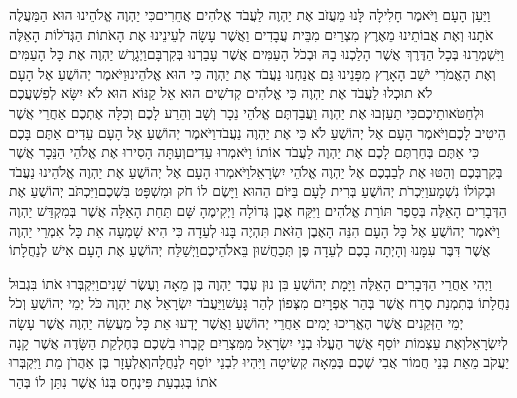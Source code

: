 \documentclass[../main/main.tex]{subfiles}
\begin{document}
\begin{multicols*}{\ncols}
וַיַּעַן הָעָם וַיֹּאמֶר חָלִילָה לָּנוּ מֵעֲזֹב אֶת יַהְוֶה לַעֲבֹד אֱלֹהִים אֲחֵרִים\PreVerseSpace{}כִּי יַהְוֶה אֱלֹהֵינוּ הוּא הַמַּעֲלֶה אֹתָנוּ וְאֶת אֲבוֹתֵינוּ מֵאֶרֶץ מִצְרַיִם מִבֵּית עֲבָדִים וַאֲשֶׁר עָשָׂה לְעֵינֵינוּ אֶת הָאֹתוֹת הַגְּדֹלוֹת הָאֵלֶּה וַיִּשְׁמְרֵנוּ בְּכָל הַדֶּרֶךְ אֲשֶׁר הָלַכְנוּ בָהּ וּבְכֹל הָעַמִּים אֲשֶׁר עָבַרְנוּ בְּקִרְבָּם\PreVerseSpace{}וַיְגָרֶשׁ יַהְוֶה אֶת כָּל הָעַמִּים וְאֶת הָאֱמֹרִי יֹשֵׁב הָאָרֶץ מִפָּנֵינוּ גַּם אֲנַחְנוּ נַעֲבֹד אֶת יַהְוֶה כִּי הוּא אֱלֹהֵינוּ\PreVerseSpace{}וַיֹּאמֶר יְהוֹשֻׁעַ אֶל הָעָם לֹא תוּכְלוּ לַעֲבֹד אֶת יַהְוֶה כִּי אֱלֹהִים קְדֹשִׁים הוּא אֵל קַנּוֹא הוּא לֹא יִשָּׂא לְפִשְׁעֲכֶם וּלְחַטֹּאותֵיכֶם\PreVerseSpace{}כִּי תַעַזְבוּ אֶת יַהְוֶה וַעֲבַדְתֶּם אֱלֹהֵי נֵכָר וְשָׁב וְהֵרַע לָכֶם וְכִלָּה אֶתְכֶם אַחֲרֵי אֲשֶׁר הֵיטִיב לָכֶם\PreVerseSpace{}וַיֹּאמֶר הָעָם אֶל יְהוֹשֻׁעַ לֹא כִּי אֶת יַהְוֶה נַעֲבֹד\PreVerseSpace{}וַיֹּאמֶר יְהוֹשֻׁעַ אֶל הָעָם עֵדִים אַתֶּם בָּכֶם כִּי אַתֶּם בְּחַרְתֶּם לָכֶם אֶת יַהְוֶה לַעֲבֹד אוֹתוֹ וַיֹּאמְרוּ עֵדִים\PreVerseSpace{}וְעַתָּה הָסִירוּ אֶת אֱלֹהֵי הַנֵּכָר אֲשֶׁר בְּקִרְבְּכֶם וְהַטּוּ אֶת לְבַבְכֶם אֶל יַהְוֶה אֱלֹהֵי יִשְׂרָאֵל\PreVerseSpace{}וַיֹּאמְרוּ הָעָם אֶל יְהוֹשֻׁעַ אֶת יַהְוֶה אֱלֹהֵינוּ נַעֲבֹד וּבְקוֹלוֹ נִשְׁמָע\PreVerseSpace{}וַיִּכְרֹת יְהוֹשֻׁעַ בְּרִית לָעָם בַּיּוֹם הַהוּא וַיָּשֶׂם לוֹ חֹק וּמִשְׁפָּט בִּשְׁכֶם\PreVerseSpace{}וַיִּכְתֹּב יְהוֹשֻׁעַ אֶת הַדְּבָרִים הָאֵלֶּה בְּסֵפֶר תּוֹרַת אֱלֹהִים וַיִּקַּח אֶבֶן גְּדוֹלָה וַיְקִימֶהָ שָּׁם תַּחַת הָאַלָּה אֲשֶׁר בְּמִקְדַּשׁ יַהְוֶה \ClosedSection{}וַיֹּאמֶר יְהוֹשֻׁעַ אֶל כָּל הָעָם הִנֵּה הָאֶבֶן הַזֹּאת תִּהְיֶה בָּנוּ לְעֵדָה כִּי הִיא שָׁמְעָה אֵת כָּל אִמְרֵי יַהְוֶה אֲשֶׁר דִּבֶּר עִמָּנוּ וְהָיְתָה בָכֶם לְעֵדָה פֶּן תְּכַחֲשׁוּן בֵּאלֹהֵיכֶם\PreVerseSpace{}וַיְשַׁלַּח יְהוֹשֻׁעַ אֶת הָעָם אִישׁ לְנַחֲלָתוֹ\OpenSection{}\par
{}וַיְהִי אַחֲרֵי הַדְּבָרִים הָאֵלֶּה וַיָּמָת יְהוֹשֻׁעַ בִּן נוּן עֶבֶד יַהְוֶה בֶּן מֵאָה וָעֶשֶׂר שָׁנִים\PreVerseSpace{}וַיִּקְבְּרוּ אֹתוֹ בִּגְבוּל נַחֲלָתוֹ בְּתִמְנַת סֶרַח אֲשֶׁר בְּהַר אֶפְרָיִם מִצְּפוֹן לְהַר גָּעַשׁ\PreVerseSpace{}וַיַּעֲבֹד יִשְׂרָאֵל אֶת יַהְוֶה כֹּל יְמֵי יְהוֹשֻׁעַ וְכֹל יְמֵי הַזְּקֵנִים אֲשֶׁר הֶאֱרִיכוּ יָמִים אַחֲרֵי יְהוֹשֻׁעַ וַאֲשֶׁר יָדְעוּ אֵת כָּל מַעֲשֵׂה יַהְוֶה אֲשֶׁר עָשָׂה לְיִשְׂרָאֵל\PreVerseSpace{}וְאֶת עַצְמוֹת יוֹסֵף אֲשֶׁר הֶעֱלוּ בְנֵי יִשְׂרָאֵל מִמִּצְרַיִם קָבְרוּ בִשְׁכֶם בְּחֶלְקַת הַשָּׂדֶה אֲשֶׁר קָנָה יַעֲקֹב מֵאֵת בְּנֵי חֲמוֹר אֲבִי שְׁכֶם בְּמֵאָה קְשִׂיטָה וַיִּהְיוּ לִבְנֵי יוֹסֵף לְנַחֲלָה\PreVerseSpace{}וְאֶלְעָזָר בֶּן אַהֲרֹן מֵת וַיִּקְבְּרוּ אֹתוֹ בְּגִבְעַת פִּינְחָס בְּנוֹ אֲשֶׁר נִתַּן לוֹ בְּהַר\par
\end{multicols*}
\end{document}
